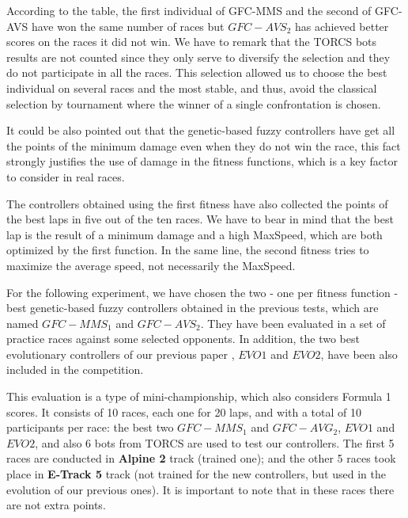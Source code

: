 \documentclass[conference]{IEEEtran}
\begin{document}
According to the table, the first individual of GFC-MMS and the second of GFC-AVS have won the same number of races but $GFC-AVS_2$ has achieved better scores on the races it did not win.
We have to remark that the TORCS bots results are not counted since they only serve to diversify the selection and they do not participate in all the races.
This selection allowed us to choose the best individual on several races and the most stable, and thus, avoid the classical selection by tournament where the winner of a single confrontation is chosen.

It could be also pointed out that the genetic-based fuzzy controllers have get all the points of the minimum damage even when they do not win the race, this fact strongly justifies the use of damage in the fitness functions, which is a key factor to consider in real races.

The controllers obtained using the first fitness have also collected the points of the best laps in five out of the ten races. We have to bear in mind that the best lap is the result of a minimum damage and a high MaxSpeed, which are both optimized by the first function. In the same line, the second fitness tries to maximize the average speed, not necessarily the MaxSpeed.

For the following experiment, we have chosen the two - one per fitness function - best genetic-based fuzzy controllers obtained in the previous tests, which are named $GFC-MMS_1$ and $GFC-AVS_2$. They have been evaluated in a set of practice races against some selected opponents. In addition, the two best evolutionary controllers of our previous paper \cite{evo18}, $EVO1$ and $EVO2$, have been also included in the competition.

This evaluation is a type of mini-championship, which also considers Formula 1 scores. It consists of 10 races, each one for 20 laps, and with a total of 10 participants per race: the best two $GFC-MMS_1$ and $GFC-AVG_2$, $EVO1$ and $EVO2$, and also 6 bots from TORCS are used to test our controllers. The first 5 races are conducted in \textbf{Alpine 2} track (trained one); and the other 5 races took place in \textbf{E-Track 5} track (not trained for the new controllers, but used in the evolution of our previous ones).
It is important to note that in these races there are not extra points.
\end{document}
